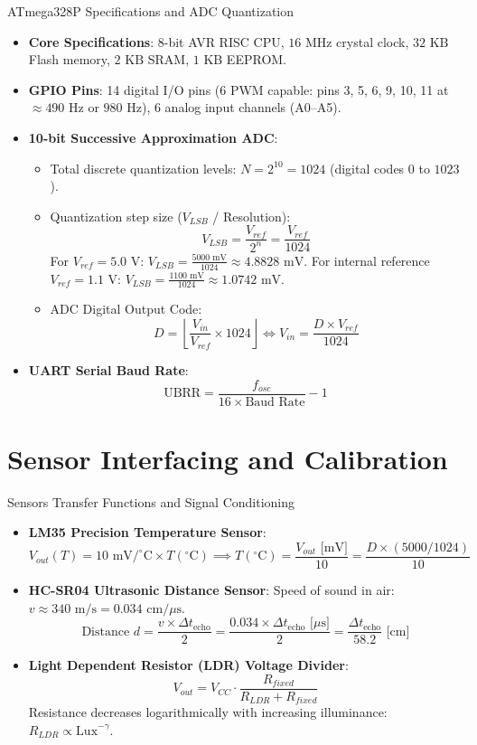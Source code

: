 \begin{formulabox}{ATmega328P Specifications and ADC Quantization}
\begin{itemize}[leftmargin=1.5em]
    \item \textbf{Core Specifications}: 8-bit AVR RISC CPU, $16\text{ MHz}$ crystal clock, $32\text{ KB}$ Flash memory, $2\text{ KB}$ SRAM, $1\text{ KB}$ EEPROM.
    \item \textbf{GPIO Pins}: 14 digital I/O pins (6 PWM capable: pins 3, 5, 6, 9, 10, 11 at $\approx 490\text{ Hz}$ or $980\text{ Hz}$), 6 analog input channels (A0--A5).
    \item \textbf{10-bit Successive Approximation ADC}:
    \begin{itemize}
        \item Total discrete quantization levels: $N = 2^{10} = 1024$ (digital codes $0$ to $1023$).
        \item Quantization step size ($V_{LSB}$ / Resolution):
        \[ V_{LSB} = \frac{V_{ref}}{2^n} = \frac{V_{ref}}{1024} \]
        For $V_{ref} = 5.0\text{ V}$: $V_{LSB} = \frac{5000\text{ mV}}{1024} \approx 4.8828\text{ mV}$.
        For internal reference $V_{ref} = 1.1\text{ V}$: $V_{LSB} = \frac{1100\text{ mV}}{1024} \approx 1.0742\text{ mV}$.
        \item ADC Digital Output Code:
        \[ D = \left\lfloor \frac{V_{in}}{V_{ref}} \times 1024 \right\rfloor \iff V_{in} = \frac{D \times V_{ref}}{1024} \]
    \end{itemize}
    \item \textbf{UART Serial Baud Rate}:
    \[ \text{UBRR} = \frac{f_{osc}}{16 \times \text{Baud Rate}} - 1 \]
\end{itemize}
\end{formulabox}

\section{Sensor Interfacing and Calibration}

\begin{formulabox}{Sensors Transfer Functions and Signal Conditioning}
\begin{itemize}[leftmargin=1.5em]
    \item \textbf{LM35 Precision Temperature Sensor}:
    \[ V_{out}(T) = 10\text{ mV}/^\circ\text{C} \times T(^\circ\text{C}) \implies T(^\circ\text{C}) = \frac{V_{out}\text{ [mV]}}{10} = \frac{D \times (5000 / 1024)}{10} \]
    \item \textbf{HC-SR04 Ultrasonic Distance Sensor}:
    Speed of sound in air: $v \approx 340\text{ m/s} = 0.034\text{ cm}/\mu\text{s}$.
    \[ \text{Distance } d = \frac{v \times \Delta t_{\text{echo}}}{2} = \frac{0.034 \times \Delta t_{\text{echo}}\text{ [$\mu$s]}}{2} = \frac{\Delta t_{\text{echo}}}{58.2} \text{ [cm]} \]
    \item \textbf{Light Dependent Resistor (LDR) Voltage Divider}:
    \[ V_{out} = V_{CC} \cdot \frac{R_{fixed}}{R_{LDR} + R_{fixed}} \]
    Resistance decreases logarithmically with increasing illuminance: $R_{LDR} \propto \text{Lux}^{-\gamma}$.
\end{itemize}
\end{formulabox}

